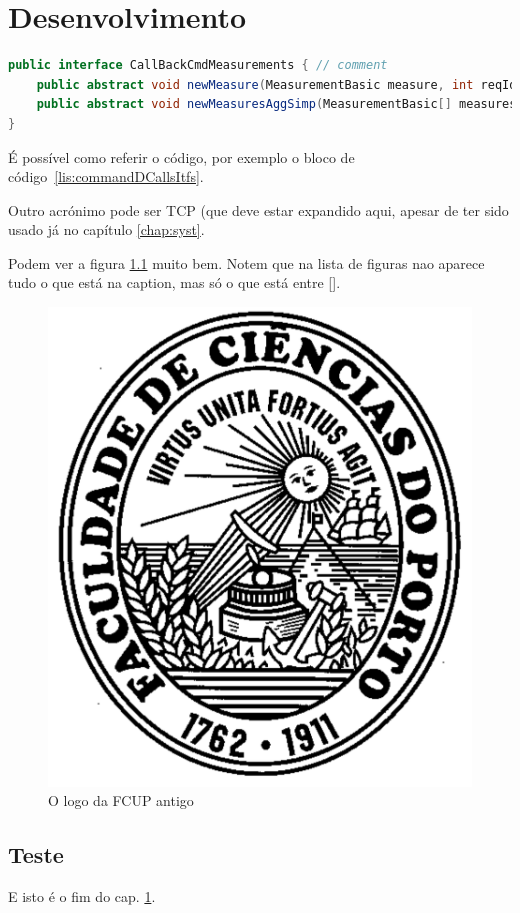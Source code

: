 \chapter{Desenvolvimento}\label{chap:dese}

\begin{lstlisting}[numbers=none,language=java,caption={[CommandDaemonCallsItf]
   {CommandDaemon} callback interfaces},label=lis:commandDCallsItfs,float=htb]
public interface CallBackCmdMeasurements { // comment
	public abstract void newMeasure(MeasurementBasic measure, int reqId);
	public abstract void newMeasuresAggSimp(MeasurementBasic[] measuresAggSimp, 'A string');
}
\end{lstlisting}

É possível como referir o código, por exemplo o bloco de código~\ref{lis:commandDCallsItfs}.

Outro acrónimo pode ser \ac{TCP} (que deve estar expandido aqui, apesar de ter sido usado já no capítulo \ref{chap:syst}.

Podem ver a figura \ref{fig:logoFCUP} muito bem. Notem que na lista de figuras nao aparece tudo o que está na caption, mas só o que está entre [].



\begin{figure}[htb]
   \centering
   \includegraphics[scale=.4]{pics/fc_logo}
   \caption[FCUP logo velho]{O logo da FCUP antigo}\label{fig:logoFCUP}
\end{figure}


\lipsum[3-7]
\section{Teste}
\lipsum[1]
E isto é o fim do cap. \ref{chap:dese}.

